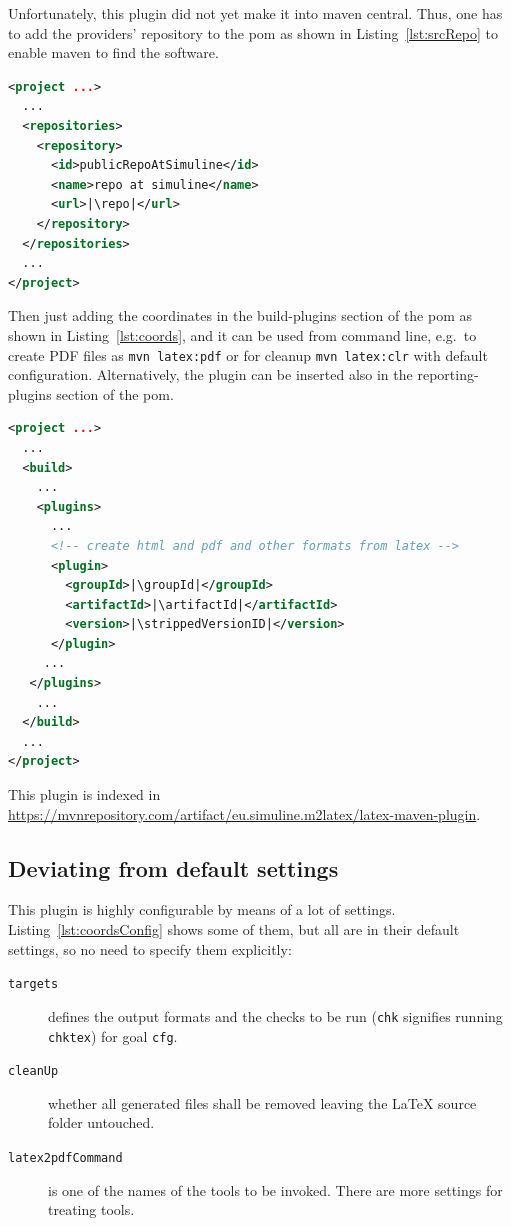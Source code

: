 Unfortunately, this plugin did not yet make it into maven central.
Thus, one has to add the providers' repository to the pom
as shown in Listing~\ref{lst:srcRepo} to enable maven to find the software. 

\begin{lstlisting}[language=xml, basicstyle=\footnotesize,
escapechar=|,
float, captionpos=b, label={lst:srcRepo}, 
caption={The source repository for this plugin}]
<project ...>
  ...
  <repositories>
    <repository>
      <id>publicRepoAtSimuline</id>
      <name>repo at simuline</name>
      <url>|\repo|</url>
    </repository>
  </repositories>
  ...
</project>
\end{lstlisting}

Then just adding the coordinates in the build-plugins section of the pom
as shown in Listing~\ref{lst:coords}, 
and it can be used from command line,
e.g.~to create PDF files as \texttt{mvn latex:pdf}
or for cleanup \texttt{mvn latex:clr} with default configuration. 
Alternatively, the plugin can be inserted also 
in the reporting-plugins section of the pom. 
%
\begin{lstlisting}[language=xml, basicstyle=\footnotesize,
escapechar=|,
float, captionpos=b, label={lst:coords}, 
caption={The coordinates of this plugin}]
<project ...>
  ...
  <build>
    ...
    <plugins>
      ...
      <!-- create html and pdf and other formats from latex -->
      <plugin>
        <groupId>|\groupId|</groupId>
        <artifactId>|\artifactId|</artifactId>
        <version>|\strippedVersionID|</version>
      </plugin>
     ...
   </plugins>
    ...
  </build>
  ...
</project>
\end{lstlisting}

This plugin is indexed 
in \url{https://mvnrepository.com/artifact/eu.simuline.m2latex/latex-maven-plugin}. 

\subsection{Deviating from default settings}\label{subsec:xmlPomSettings}

This plugin is highly configurable by means of a lot of settings. 
Listing~\ref{lst:coordsConfig} shows some of them, but all are in their default settings, 
so no need to specify them explicitly: 
%
\begin{description}
\item[\texttt{targets}] defines the output formats and the checks to be run 
(\texttt{chk} signifies running \texttt{chktex}) for goal \texttt{cfg}. 
\item[\texttt{cleanUp}] whether all generated files shall be removed 
leaving the \LaTeX{} source folder untouched. 
\item[\texttt{latex2pdfCommand}] is one of the names of the tools to be invoked. 
There are more settings for treating tools. 
\end{description}

